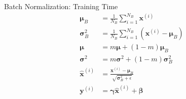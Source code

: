 \begin{frame}{Batch Normalization: Training Time}
\begin{align*}
\pmb{\mu}_B &= \frac{1}{N_B}\sum_{i=1}^{N_B} \pmb{x}^{(i)}\\
\pmb{\sigma}_B^2 &= \frac{1}{N_B} \sum_{i=1}^{N_B}(\pmb{x}^{(i)} - \pmb{\mu}_B)\\
\pmb{\mu} &= m \pmb{\mu} + (1-m)\pmb{\mu}_B \tag{Running average}\\
\pmb{\sigma}^2 &= m \pmb{\sigma}^2 + (1-m)\pmb{\sigma}_B^2 \tag{Running average}\\
\hat{\pmb{x}}^{(i)} &= \frac{\pmb{x}^{(i)} - \pmb{\mu}_B}{\sqrt{\pmb{\sigma}_B^2 + \epsilon}}\\
\pmb{y}^{(i)} &= \pmb{\gamma} \hat{\pmb{x}}^{(i)} + \pmb{\beta}
\end{align*}
%
%
\end{frame}

